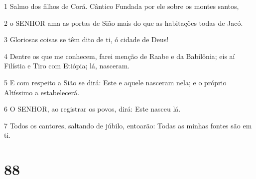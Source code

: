 \par 1 Salmo dos filhos de Corá. Cântico Fundada por ele sobre os montes santos,
\par 2 o SENHOR ama as portas de Sião mais do que as habitações todas de Jacó.
\par 3 Gloriosas coisas se têm dito de ti, ó cidade de Deus!
\par 4 Dentre os que me conhecem, farei menção de Raabe e da Babilônia; eis aí Filístia e Tiro com Etiópia; lá, nasceram.
\par 5 E com respeito a Sião se dirá: Este e aquele nasceram nela; e o próprio Altíssimo a estabelecerá.
\par 6 O SENHOR, ao registrar os povos, dirá: Este nasceu lá.
\par 7 Todos os cantores, saltando de júbilo, entoarão: Todas as minhas fontes são em ti.

\chapter{88}

